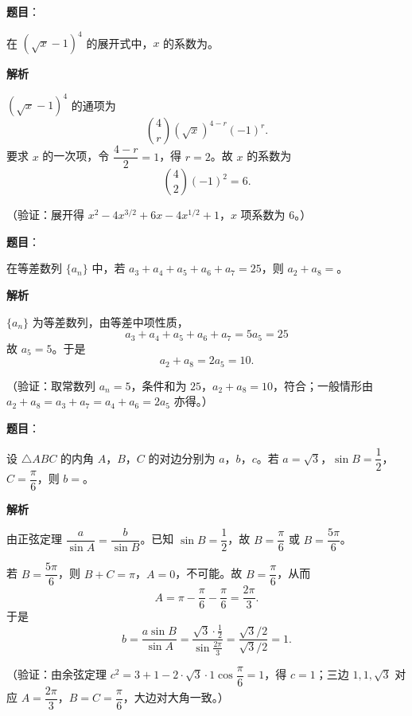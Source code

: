 \begin{answer}

\textbf{题目}：

在 \((\sqrt{x}-1)^4\) 的展开式中，\(x\) 的系数为\gkblank{}。

\textbf{解析}

\((\sqrt{x}-1)^4\) 的通项为
\nopagebreak[4]
\[
\binom{4}{r}(\sqrt{x})^{4-r}(-1)^r.
\]
要求 \(x\) 的一次项，令 \(\dfrac{4-r}{2}=1\)，得 \(r=2\)。故 \(x\) 的系数为
\nopagebreak[4]
\[
\binom{4}{2}(-1)^2=6.
\]

（验证：展开得 \(x^2-4x^{3/2}+6x-4x^{1/2}+1\)，\(x\) 项系数为 \(6\)。）


\end{answer}
\begin{answer}

\textbf{题目}：

在等差数列 \(\{a_n\}\) 中，若 \(a_3+a_4+a_5+a_6+a_7=25\)，则 \(a_2+a_8=\)\gkblank{}。

\textbf{解析}

\(\{a_n\}\) 为等差数列，由等差中项性质，
\nopagebreak[4]
\[
a_3+a_4+a_5+a_6+a_7=5a_5=25
\]
故 \(a_5=5\)。于是
\nopagebreak[4]
\[
a_2+a_8=2a_5=10.
\]

（验证：取常数列 \(a_n=5\)，条件和为 \(25\)，\(a_2+a_8=10\)，符合；一般情形由 \(a_2+a_8=a_3+a_7=a_4+a_6=2a_5\) 亦得。）


\end{answer}
\begin{answer}

\textbf{题目}：

设 \(\triangle ABC\) 的内角 \(A\)，\(B\)，\(C\) 的对边分别为 \(a\)，\(b\)，\(c\)。若 \(a=\sqrt{3}\)，\(\sin B=\dfrac{1}{2}\)，\(C=\dfrac{\pi}{6}\)，则 \(b=\)\gkblank{}。

\textbf{解析}

由正弦定理 \(\dfrac{a}{\sin A}=\dfrac{b}{\sin B}\)。已知 \(\sin B=\dfrac12\)，故 \(B=\dfrac{\pi}{6}\) 或 \(B=\dfrac{5\pi}{6}\)。

若 \(B=\dfrac{5\pi}{6}\)，则 \(B+C=\pi\)，\(A=0\)，不可能。故 \(B=\dfrac{\pi}{6}\)，从而
\nopagebreak[4]
\[
A=\pi-\frac{\pi}{6}-\frac{\pi}{6}=\frac{2\pi}{3}.
\]
于是
\nopagebreak[4]
\[
b=\frac{a\sin B}{\sin A}
=\frac{\sqrt3\cdot\frac12}{\sin\frac{2\pi}{3}}
=\frac{\sqrt3/2}{\sqrt3/2}=1.
\]

（验证：由余弦定理 \(c^2=3+1-2\cdot\sqrt3\cdot1\cos\dfrac{\pi}{6}=1\)，得 \(c=1\)；三边 \(1,1,\sqrt3\) 对应 \(A=\dfrac{2\pi}{3}\)，\(B=C=\dfrac{\pi}{6}\)，大边对大角一致。）


\end{answer}
